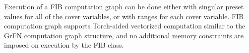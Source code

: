 Execution of a FIB computation graph can be done either with singular preset values for all of the cover variables, or with ranges for each cover variable. FIB computation graph supports Torch-aided vectorized computation similar to the GrFN computation graph structure, and no additional memory constraints are imposed on execution by the FIB class.
